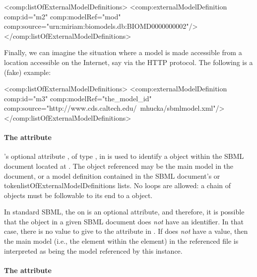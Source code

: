\begin{example}
<comp:listOfExternalModelDefinitions>
    <comp:externalModelDefinition comp:id="m2" comp:modelRef="mod"
                                  comp:source="urn:miriam:biomodels.db:BIOMD0000000002"/>
</comp:listOfExternalModelDefinitions>
\end{example}

Finally, we can imagine the situation where a model is made accessible
from a location accessible on the Internet, say via the HTTP protocol.
The following is a (fake) example:

\begin{example}
<comp:listOfExternalModelDefinitions>
    <comp:externalModelDefinition comp:id="m3" comp:modelRef="the_model_id"
                                  comp:source="http://www.cds.caltech.edu/~mhucka/sbmlmodel.xml"/>
</comp:listOfExternalModelDefinitions>
\end{example}



\paragraph{The \fixttspace{} attribute}

\ExternalModelDefinition's optional attribute , of type
, in is used to identify a \Model object within the
SBML document located at .  The object referenced may be
the main model in the document, or a model definition contained in the
SBML document's  or 
token{listOfExternalModelDefinitions} lists.  No loops are allowed:
a chain of \ExternalModelDefinition objects must be followable to its end
to a \Model object.

In standard SBML, the  on \Model is an optional attribute, and
therefore, it is possible that the \Model object in a given SBML
document does \emph{not} have an identifier.  In that case, there is no
value to give to the  attribute in
\ExternalModelDefinition.  If  does \emph{not} have a
value, then the main model (i.e., the  element within the
 element) in the referenced file is interpreted as being
the model referenced by this \ExternalModelDefinition instance.


\paragraph{The \fixttspace{} attribute}

